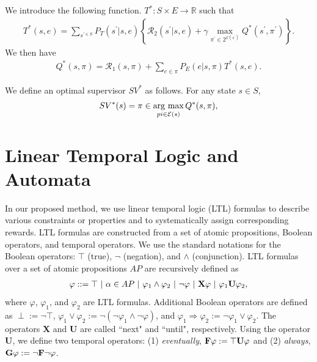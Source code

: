 \documentclass[a4j,12pt,oneside,openany,english,dvipdfmx]{jsbook}
\newcommand{\argmax}{\mathop{\rm arg~max}\limits}
\begin{document}
\begin{definition}
  We introduce the following function. $T^{\ast} : S \times E \rightarrow \mathbb{R}$ such that
  \begin{align}
    T^{\ast}(s,e) = \sum_{s^{\prime \in S}} P_T(s^{\prime}|s,e) \left \{ \mathcal{R}_2(s^{\prime}|s,e) + \gamma \max_{\pi^{\prime} \in 2^{\mathcal{E}(s^{\prime})}} Q^{\ast}(s^{\prime}, \pi^{\prime}) \right \}.
  \end{align}
  We then have
  \begin{align}
    Q^{\ast}(s,\pi) = \mathcal{R}_1(s,\pi) + \sum_{e \in \pi}P_E(e|s,\pi) T^{\ast}(s,e).
  \end{align}

\end{definition}

\begin{definition}
We define an optimal supervisor $SV^{\ast}$ as follows. For any state $s \in S$,
\begin{align}
  SV^{\ast}(s) = \pi \in \argmax_{pi \in \mathcal{E}(s)} Q^{\ast}(s,\pi),
\end{align}
\end{definition}

\section{Linear Temporal Logic and Automata}

In our proposed method, we use linear temporal logic (LTL) formulas to describe various constraints or properties and to systematically assign corresponding rewards.
LTL formulas are constructed from a set of atomic propositions, Boolean operators, and temporal operators. We use the standard notations for the Boolean operators: $\top$ (true), $\neg$ (negation), and $\land$ (conjunction).
LTL formulas over a set of atomic propositions $AP$ are recursively defined as
\begin{align*}
  \varphi ::=\top\ |\ \alpha \in AP\ |\ \varphi_1 \land \varphi_2\ |\ \neg \varphi\ |\ \text{{\bf X}} \varphi\ |\ \varphi_1 \text{{\bf U}} \varphi_2,
\end{align*}
where $\varphi$, $\varphi_1$, and $\varphi_2$ are LTL formulas.
Additional Boolean operators are defined as $\perp := \neg \top $, $\varphi_1 \lor \varphi_2 := \neg(\neg \varphi_1 \land \neg \varphi)$, and $\varphi_1 \Rightarrow \varphi_2 := \neg \varphi_1 \lor \varphi_2$.
The operators {\bf X} and {\bf U} are called ``next" and ``until", respectively.
Using the operator {\bf U}, we define two temporal operators: (1) {\it eventually}, $\text{{\bf F}} \varphi := \top \text{{\bf U}} \varphi $ and (2) {\it always}, $\text{{\bf G}} \varphi := \neg \text{{\bf F}} \neg \varphi$.
\end{document}
